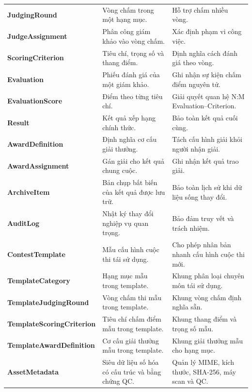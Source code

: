 \begin{table}[!ht]
\begin{tabularx}{\textwidth}{>{\bfseries}p{3.2cm}p{4.8cm}>{\raggedright\arraybackslash}X}
\textbf{JudgingRound} & Vòng chấm trong một hạng mục. & Hỗ trợ chấm nhiều vòng. \\
\textbf{JudgeAssignment} & Phân công giám khảo vào vòng chấm. & Xác định phạm vi công việc. \\
\textbf{ScoringCriterion} & Tiêu chí, trọng số và thang điểm. & Định nghĩa cách đánh giá theo vòng. \\
\textbf{Evaluation} & Phiếu đánh giá của một giám khảo. & Ghi nhận sự kiện chấm điểm nguyên tử. \\
\textbf{EvaluationScore} & Điểm theo từng tiêu chí. & Giải quyết quan hệ N:M Evaluation--Criterion. \\
\textbf{Result} & Kết quả xếp hạng chính thức. & Bảo toàn kết quả cuối cùng. \\
\textbf{AwardDefinition} & Định nghĩa cơ cấu giải thưởng. & Tách cấu hình giải khỏi người nhận giải. \\
\textbf{AwardAssignment} & Gán giải cho kết quả chung cuộc. & Ghi nhận kết quả trao giải. \\
\textbf{ArchiveItem} & Bản chụp bất biến của kết quả được lưu trữ. & Bảo toàn lịch sử khi dữ liệu sống thay đổi. \\
\textbf{AuditLog} & Nhật ký thay đổi nghiệp vụ quan trọng. & Bảo đảm truy vết và trách nhiệm. \\
\textbf{ContestTemplate} & Mẫu cấu hình cuộc thi tái sử dụng. & Cho phép nhân bản nhanh cấu hình cuộc thi mới. \\
\textbf{TemplateCategory} & Hạng mục mẫu trong template. & Khung phân loại chuyên môn tái sử dụng. \\
\textbf{TemplateJudgingRound} & Vòng chấm thi mẫu trong template. & Khung vòng chấm định nghĩa sẵn. \\
\textbf{TemplateScoringCriterion} & Tiêu chí chấm điểm mẫu trong template. & Khung thang điểm và trọng số mẫu. \\
\textbf{TemplateAwardDefinition} & Cơ cấu giải thưởng mẫu trong template. & Khung giải thưởng mẫu cho hạng mục. \\
\textbf{AssetMetadata} & Siêu dữ liệu số hóa có cấu trúc và bằng chứng QC. & Quản lý MIME, kích thước, SHA-256, máy scan và QC. \\
\bottomrule
\end{tabularx}
\end{table}

